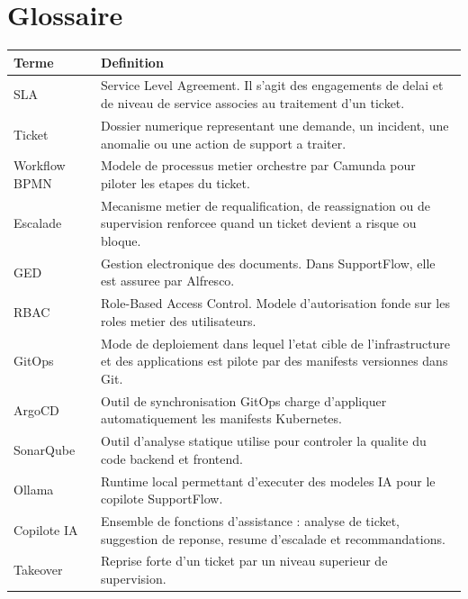 \chapter*{Glossaire}

\begin{longtable}{>{\raggedright\arraybackslash}p{3.1cm} >{\raggedright\arraybackslash}p{11.2cm}}
\toprule
Terme & Definition \\
\midrule
SLA & Service Level Agreement. Il s'agit des engagements de delai et de niveau de service associes au traitement d'un ticket. \\
Ticket & Dossier numerique representant une demande, un incident, une anomalie ou une action de support a traiter. \\
Workflow BPMN & Modele de processus metier orchestre par Camunda pour piloter les etapes du ticket. \\
Escalade & Mecanisme metier de requalification, de reassignation ou de supervision renforcee quand un ticket devient a risque ou bloque. \\
GED & Gestion electronique des documents. Dans SupportFlow, elle est assuree par Alfresco. \\
RBAC & Role-Based Access Control. Modele d'autorisation fonde sur les roles metier des utilisateurs. \\
GitOps & Mode de deploiement dans lequel l'etat cible de l'infrastructure et des applications est pilote par des manifests versionnes dans Git. \\
ArgoCD & Outil de synchronisation GitOps charge d'appliquer automatiquement les manifests Kubernetes. \\
SonarQube & Outil d'analyse statique utilise pour controler la qualite du code backend et frontend. \\
Ollama & Runtime local permettant d'executer des modeles IA pour le copilote SupportFlow. \\
Copilote IA & Ensemble de fonctions d'assistance : analyse de ticket, suggestion de reponse, resume d'escalade et recommandations. \\
Takeover & Reprise forte d'un ticket par un niveau superieur de supervision. \\
\bottomrule
\end{longtable}
